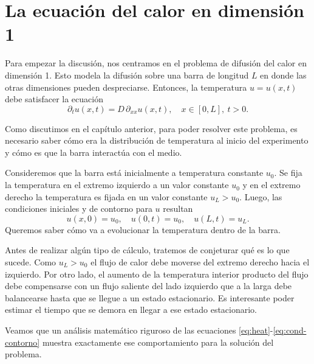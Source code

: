 \documentclass[12pt, a4paper]{amsbook}
\theoremstyle{remark}
\theoremstyle{definition}
\numberwithin{section}{chapter}
\numberwithin{subsection}{section}
\numberwithin{equation}{section}
\numberwithin{figure}{chapter}
\begin{document}
\section{La ecuación del calor en dimensión 1}\label{sec:heat.n=1}


Para empezar la discusión, nos centramos en el problema de difusión del calor en dimensión 1. Esto modela la difusión sobre una barra de longitud $L$ en donde las otras dimensiones pueden despreciarse. Entonces, la temperatura $u=u(x,t)$ debe satisfacer la ecuación
\begin{equation}
\partial_t u(x,t) = D\, \partial_{xx} u(x,t),\quad x\in [0,L],\ t>0.
\label{eq:heat}
\end{equation}

Como discutimos en el capítulo anterior, para poder resolver este problema, es necesario saber cómo era la distribución de temperatura al inicio del experimento y cómo es que la barra interactúa con el medio.

Consideremos que la barra está inicialmente a temperatura constante $u_0$. Se fija la temperatura en el extremo izquierdo a un valor constante $u_0$ y en el extremo derecho la temperatura es fijada en un valor constante $u_L>u_0$. Luego, las condiciones iniciales y de contorno para $u$ resultan
\begin{equation}
u(x, 0) = u_0,\quad u(0,t)=u_0,\quad u(L, t)= u_L.
\label{eq:cond-contorno}
\end{equation}
Queremos saber cómo va a evolucionar la temperatura dentro de la barra.

Antes de realizar algún tipo de cálculo, tratemos de conjeturar qué es lo que sucede. Como $u_L>u_0$ el flujo de calor debe moverse del extremo derecho hacia el izquierdo. Por otro lado, el aumento de la temperatura interior producto del flujo debe compensarse con un flujo saliente del lado izquierdo que a la larga debe balancearse hasta que se llegue a un estado estacionario. Es interesante poder estimar el tiempo que se demora en llegar a ese estado estacionario.

Veamos que un análisis matemático riguroso de las ecuaciones \eqref{eq:heat}-\eqref{eq:cond-contorno} muestra exactamente ese comportamiento para la solución del problema.
\end{document}
